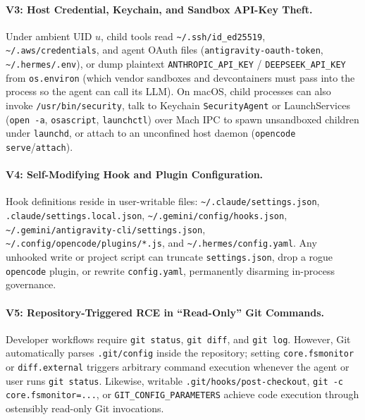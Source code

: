 \documentclass[10pt,twocolumn]{article}
\begin{document}
\paragraph{V3: Host Credential, Keychain, and Sandbox API-Key Theft.}
Under ambient UID $u$, child tools read \texttt{\textasciitilde/.ssh/id\_ed25519}, \texttt{\textasciitilde/.aws/credentials}, and agent OAuth files (\texttt{antigravity-oauth-token}, \texttt{\textasciitilde/.hermes/.env}), or dump plaintext \texttt{ANTHROPIC\_API\_KEY} / \texttt{DEEPSEEK\_API\_KEY} from \texttt{os.environ} (which vendor sandboxes and devcontainers must pass into the process so the agent can call its LLM). On macOS, child processes can also invoke \texttt{/usr/bin/security}, talk to Keychain \texttt{SecurityAgent} or LaunchServices (\texttt{open -a}, \texttt{osascript}, \texttt{launchctl}) over Mach IPC to spawn unsandboxed children under \texttt{launchd}, or attach to an unconfined host daemon (\texttt{opencode serve}/\texttt{attach}).

\paragraph{V4: Self-Modifying Hook and Plugin Configuration.}
Hook definitions reside in user-writable files: \texttt{\textasciitilde/.claude/settings.json}, \texttt{.claude/settings.local.json}, \texttt{\textasciitilde/.gemini/config/hooks.json}, \texttt{\textasciitilde/.gemini/antigravity-cli/settings.json}, \texttt{\textasciitilde/.config/opencode/plugins/*.js}, and \texttt{\textasciitilde/.hermes/config.yaml}. Any unhooked write or project script can truncate \texttt{settings.json}, drop a rogue \texttt{opencode} plugin, or rewrite \texttt{config.yaml}, permanently disarming in-process governance.

\paragraph{V5: Repository-Triggered RCE in ``Read-Only'' Git Commands.}
Developer workflows require \texttt{git status}, \texttt{git diff}, and \texttt{git log}. However, Git automatically parses \texttt{.git/config} inside the repository; setting \texttt{core.fsmonitor} or \texttt{diff.external} triggers arbitrary command execution whenever the agent or user runs \texttt{git status}. Likewise, writable \texttt{.git/hooks/post-checkout}, \texttt{git -c core.fsmonitor=...}, or \texttt{GIT\_CONFIG\_PARAMETERS} achieve code execution through ostensibly read-only Git invocations.
\end{document}
